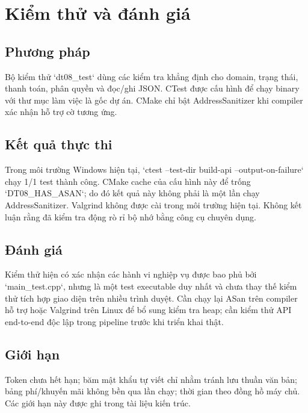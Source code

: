 \chapter{Kiểm thử và đánh giá}
\section{Phương pháp}
Bộ kiểm thử `dt08_test` dùng các kiểm tra khẳng định cho domain, trạng thái, thanh toán, phân quyền và đọc/ghi JSON. CTest được cấu hình để chạy binary với thư mục làm việc là gốc dự án. CMake chỉ bật AddressSanitizer khi compiler xác nhận hỗ trợ cờ tương ứng.

\section{Kết quả thực thi}
Trong môi trường Windows hiện tại, `ctest --test-dir build-api --output-on-failure` chạy 1/1 test thành công. CMake cache của cấu hình này để trống `DT08_HAS_ASAN`; do đó kết quả này không phải là một lần chạy AddressSanitizer. Valgrind không được cài trong môi trường hiện tại. Không kết luận rằng đã kiểm tra động rò rỉ bộ nhớ bằng công cụ chuyên dụng.

\section{Đánh giá}
Kiểm thử hiện có xác nhận các hành vi nghiệp vụ được bao phủ bởi `main_test.cpp`, nhưng là một test executable duy nhất và chưa thay thế kiểm thử tích hợp giao diện trên nhiều trình duyệt. Cần chạy lại ASan trên compiler hỗ trợ hoặc Valgrind trên Linux để bổ sung kiểm tra heap; cần kiểm thử API end-to-end độc lập trong pipeline trước khi triển khai thật.

\section{Giới hạn}
Token chưa hết hạn; băm mật khẩu tự viết chỉ nhằm tránh lưu thuần văn bản; bảng phí/khuyến mãi không bền qua lần chạy; thời gian theo đồng hồ máy chủ. Các giới hạn này được ghi trong tài liệu kiến trúc.
